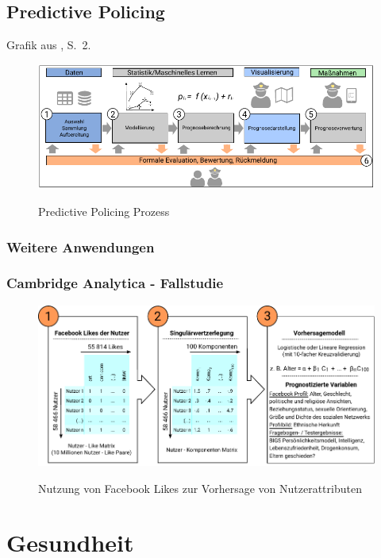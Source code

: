 \subsection{Predictive Policing}

Grafik aus \cite{Bode}, S.~2.

\begin{figure}%
\centering
\caption{Predictive Policing Prozess}
\includegraphics[scale=1.1]{Grafiken/Predictive_Policing_Ink.pdf} 
\label{pic:Predictive_Policing}
\end{figure}

\subsubsection{Weitere Anwendungen}

\subsubsection{Cambridge Analytica - Fallstudie}

\begin{figure}%
\centering
\caption{Nutzung von Facebook Likes zur Vorhersage von Nutzerattributen}
\includegraphics[scale=1.0]{Grafiken/Facebook_Likes_Ink.pdf} 
\label{pic:Like_Matrix}
\end{figure}

\section{Gesundheit}

